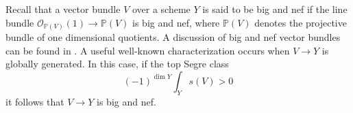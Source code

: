 Recall that a vector bundle $V$ over a scheme $Y$ is said to be big and nef if the line bundle $\mathcal O_{\mathbb P(V)}(1)\to \mathbb P(V)$ is big and nef, where $\mathbb P(V)$ denotes the projective bundle of one dimensional quotients. A discussion of big and nef vector bundles can be found in \cite[Chapters~6 and~7]{L-II}.
A useful well-known characterization occurs when $V\to Y$ is globally generated. In this case, if the top Segre class
\begin{equation}
\label{pos}(-1)^{\dim Y} \int_{Y} s(V)>0
\end{equation}
it follows that $V\to Y$ is big and nef.
